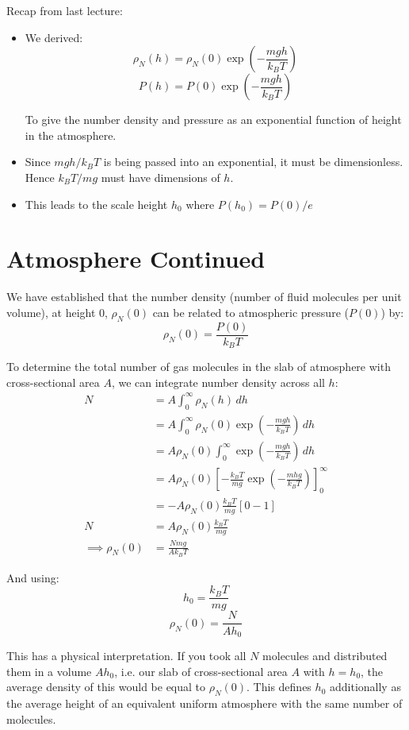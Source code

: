 
Recap from last lecture:
\begin{itemize}
    \item We derived:
    \[
        \rho_N(h) = \rho_N(0) \exp \left(- \frac{mgh}{k_B T}\right)
    \]
    \[
        P(h) = P(0) \exp \left(- \frac{mgh}{k_B T}\right)
    \]
    
    To give the number density and pressure as an exponential function of height in the atmosphere.

    \item Since $mgh / k_B T$ is being passed into an exponential, it must be dimensionless. Hence $k_B T / mg$ must have dimensions of $h$. 
    \item This leads to the scale height $h_0$ where $P(h_0) = P(0) / e $
\end{itemize}


\section{Atmosphere Continued}
We have established that the number density (number of fluid molecules per unit volume), at height 0, $\rho_N(0)$ can be related to atmospheric pressure ($P(0)$) by:
\[
    \rho_N(0) = \frac{P(0)}{k_B T}
\]

To determine the total number of gas molecules in the slab of atmosphere with cross-sectional area $A$, we can integrate number density across all $h$:
\begin{align*}
    N &= A \int_{0}^{\infty} \rho_N(h) \, dh \\
    &= A \int_{0}^{\infty} \rho_N(0) \exp\left(- \frac{mgh}{k_B T}\right) \, dh \\
    &= A \rho_N(0) \int_{0}^{\infty} \exp\left(- \frac{mgh}{k_B T}\right) \, dh \\
    &= A \rho_N(0) \left[- \frac{k_B T}{mg} \exp \left(- \frac{mhg}{k_B T}\right)\right]_0^\infty \\
    &= -A \rho_N(0) \frac{k_B T}{mg} \left[0 - 1\right] \\
    N &= A \rho_N(0) \frac{k_B T}{mg} \\
    \implies \rho_N(0) &= \frac{Nmg}{A k_B T}
\end{align*}

And using:
\[
    h_0 = \frac{k_B T}{mg}
\]
\[
    \rho_N(0) = \frac{N}{A h_0}
\]

This has a physical interpretation. If you took all $N$ molecules and distributed them in a volume $Ah_0$, i.e. our slab of cross-sectional area $A$ with $h = h_0$, the average density of this would be equal to $\rho_N(0)$. This defines $h_0$ additionally as the average height of an equivalent uniform atmosphere with the same number of molecules.

